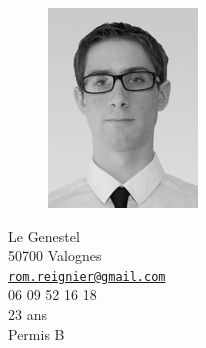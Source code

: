 \documentclass[a4paper,11pt,final]{memoir}
\begin{document}
\begin{figure}
	\hfill
	\includegraphics[width=0.5\columnwidth]{../IMG_7936-Modifier_cv}
	\vspace{-0.5cm}
\end{figure}

\begin{flushright}\small
	Le Genestel\\
	50700 Valognes\\
	{\href{mailto:rom.reignier@gmail.com}{\nolinkurl{rom.reignier@gmail.com}}}\\
	06 09 52 16 18\\
	23 ans\\
	Permis B
\end{flushright}%
\end{document}

